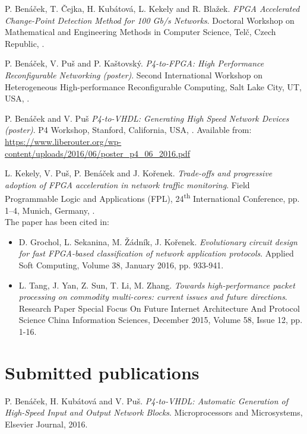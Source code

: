 \begin{thebibliography}{A.9}
P. Ben\'{a}\v{c}ek, T. \v{C}ejka, H. Kub\'{a}tov\'{a}, L. Kekely and R. Bla\v{z}ek.
\newblock \textit{FPGA Accelerated Change-Point Detection Method for 100 Gb/s Networks}.
\newblock Doctoral Workshop on Mathematical and Engineering Methods in Computer Science, Tel\v{c}, Czech Republic,
.

P. Ben\'{a}\v{c}ek, V. Pu\v{s} and P. Ka\v{s}tovsk\'y.
\newblock \textit{P4-to-FPGA: High Performance Reconfigurable Networking (poster)}.
\newblock Second International Workshop on Heterogeneous High-performance Reconfigurable Computing, Salt Lake City, UT, USA,
.

P. Ben{\'a}{\v{c}}ek and V. Pu{\v{s}} 
\newblock \textit{P4-to-VHDL: Generating High Speed Network Devices (poster)}. 
\newblock P4 Workshop, Stanford, California, USA, 
. Available from: \url{https://www.liberouter.org/wp-content/uploads/2016/06/poster\_p4\_06\_2016.pdf}

L. Kekely, V. Pu\v{s}, P. Ben{\'a}\v{c}ek and J. Ko\v{r}enek.
\newblock \textit{Trade-offs and progressive adoption of FPGA acceleration in network traffic monitoring}.
\newblock Field Programmable Logic and Applications (FPL), 24\textsuperscript{th} International Conference, pp. 1--4, Munich, Germany,
.
\smallskip \\ \smallskip The paper has been cited in:
\begin{itemize}
    \item D. Grochol, L. Sekanina, M. \v{Z}\'{a}dn\'{i}k, J. Ko\v{r}enek. \textit{Evolutionary circuit design for fast FPGA-based classification of network application protocols}. 
    Applied Soft Computing, Volume 38, January 2016, pp. 933-941.
    \item L. Tang, J. Yan, Z. Sun, T. Li, M. Zhang. \textit{Towards high-performance packet processing on commodity multi-cores: current issues and future directions}.
    Research Paper Special Focus On Future Internet Architecture And Protocol Science China Information Sciences, December 2015, Volume 58, Issue 12, pp. 1-16.
\end{itemize}

\section*{Submitted publications}
P. Ben\'{a}\v{c}ek, H. Kub\'{a}tov\'{a} and V. Pu\v{s}.
\newblock \textit{P4-to-VHDL: Automatic Generation of High-Speed Input and Output Network Blocks}.
\newblock Microprocessors and Microsystems, Elsevier Journal, 2016.


\end{thebibliography}
